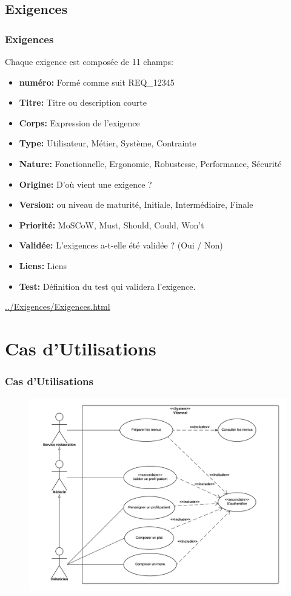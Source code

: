 \documentclass{beamer}
\begin{document}
\subsection{Exigences}
\begin{frame}
 \frametitle{Exigences}
Chaque exigence est composée de 11 champs:
\begin{itemize}
\item \textbf{numéro:} Formé comme suit REQ\_12345
\item \textbf{Titre:} Titre ou description courte
\item \textbf{Corps:} Expression de l'exigence
\item \textbf{Type:} Utilisateur, Métier, Système, Contrainte
\item \textbf{Nature:} Fonctionnelle, Ergonomie, Robustesse, Performance, Sécurité
\item \textbf{Origine:} D'où vient une exigence ?
\item \textbf{Version:} ou niveau de maturité, Initiale, Intermédiaire, Finale
\item \textbf{Priorité:} MoSCoW, Must, Should, Could, Won't
\item \textbf{Validée:} L'exigences a-t-elle été validée ? (Oui / Non)
\item \textbf{Liens:} Liens
\item \textbf{Test:} Définition du test qui validera l'exigence.
\end{itemize}

\url{../Exigences/Exigences.html}
\end{frame}

\section{Cas d'Utilisations}

\begin{frame}
\frametitle{Cas d'Utilisations}
\begin{figure}[H]
\label{schema}
  \centering
      \includegraphics[scale=0.4]{../CasDUtilisations/diagramme_cas_utilisation.png}
\end{figure}
\end{frame}
\end{document}

